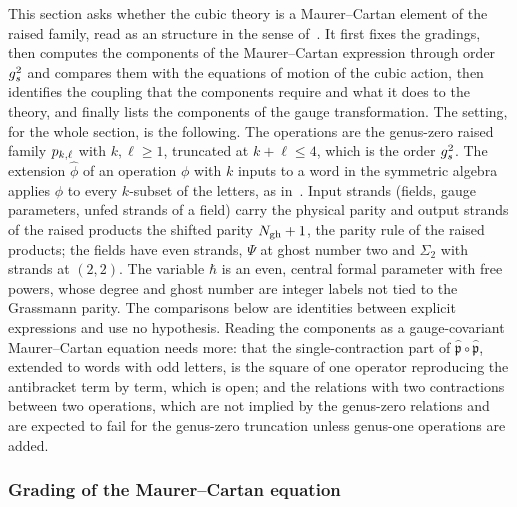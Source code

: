 This section asks whether the cubic theory is a Maurer--Cartan element of the raised family, read as an \IBL{} structure in the sense of~\cite{Cieliebak:2015:HomologicalAlgebraRelated}.
It first fixes the gradings, then computes the components of the Maurer--Cartan expression through order $g_s^2$ and compares them with the equations of motion of the cubic action, then identifies the coupling that the components require and what it does to the theory, and finally lists the components of the gauge transformation.
The setting, for the whole section, is the following.
The operations are the genus-zero raised family $p_{k,\ell}$ with $k, \ell \ge 1$, truncated at $k + \ell \le 4$, which is the order $g_s^2$.
The extension $\hat{\phi}$ of an operation $\phi$ with $k$ inputs to a word in the symmetric algebra applies $\phi$ to every $k$-subset of the letters, as in~\cite[(2.1)]{Cieliebak:2015:HomologicalAlgebraRelated}.
Input strands (fields, gauge parameters, unfed strands of a field) carry the physical parity and output strands of the raised products the shifted parity $N_{\text{gh}} + 1$, the parity rule of the raised products; the fields have even strands, $\Psi$ at ghost number two and $\Sigma_2$ with strands at $(2, 2)$.
The variable $\hbar$ is an even, central formal parameter with free powers, whose degree and ghost number are integer labels not tied to the Grassmann parity.
The comparisons below are identities between explicit expressions and use no hypothesis.
Reading the components as a gauge-covariant Maurer--Cartan equation needs more: that the single-contraction part of $\hat{\mathfrak{p}} \circ \hat{\mathfrak{p}}$, extended to words with odd letters, is the square of one operator reproducing the antibracket term by term, which is open; and the relations with two contractions between two operations, which are not implied by the genus-zero relations and are expected to fail for the genus-zero truncation unless genus-one operations are added.

\subsubsection{Grading of the Maurer--Cartan equation}

